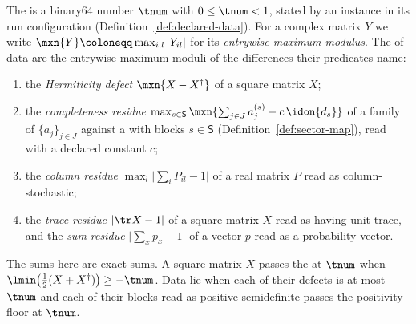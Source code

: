 
\begin{definition}\label{def:tolerance}
The  is a binary64 number
$\tnum$ with
$0\le\tnum<1$, stated by an instance in its run configuration
(Definition~\ref{def:declared-data}). For a complex matrix $Y$ we write
$\mxn{Y}\coloneqq\max_{i,l}|Y_{il}|$ for its \emph{entrywise maximum modulus}.
The  of data are the entrywise maximum moduli of the
differences
their predicates name:
\begin{enumerate}[label=(\roman*),leftmargin=2.4em]
\item the \emph{Hermiticity defect} $\mxn{X-X^{\dagger}}$ of a square matrix
  $X$;
\item the \emph{completeness residue}
  $\max_{s\in\mathsf{S}}\mxn{\sum_{j\in J}a^{(s)}_j-c\,\idon{d_s}}$ of a family of
   $\{a_j\}_{j\in J}$ against a
   with blocks $s\in\mathsf{S}$
  (Definition~\ref{def:sector-map}), read with a declared constant $c$;
\item the \emph{column residue} $\max_{l}\big|\sum_{i}P_{il}-1\big|$ of a real
  matrix $P$ read as column-stochastic;
\item the \emph{trace residue} $|\tr X-1|$ of a square matrix $X$ read as
  having unit trace, and the \emph{sum residue} $\big|\sum_{x}p_x-1\big|$ of a
  vector $p$ read as a probability vector.
\end{enumerate}
The sums here are exact sums. A square matrix $X$ passes the
 at $\tnum$
when
$\lmin\big(\tfrac12(X+X^{\dagger})\big)\ge-\tnum$. Data lie
 when each of their defects is at most
$\tnum$ and each of their blocks read as positive semidefinite passes the
positivity floor at $\tnum$.
\end{definition}
